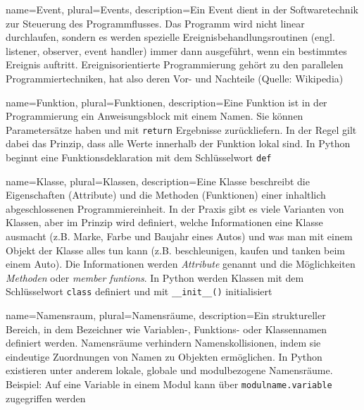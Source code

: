 {
  name={Event},
  plural={Events},
  description={Ein Event dient in der Softwaretechnik zur Steuerung des Programmflusses. Das Programm wird nicht linear durchlaufen, sondern es werden spezielle Ereignisbehandlungsroutinen (engl. listener, observer, event handler) immer dann ausgeführt, wenn ein bestimmtes Ereignis auftritt. Ereignisorientierte Programmierung gehört zu den parallelen Programmiertechniken, hat also deren Vor- und Nachteile (Quelle: Wikipedia)}
}

{
  name={Funktion},
  plural={Funktionen},
  description={Eine Funktion ist in der Programmierung ein Anweisungsblock mit einem Namen. Sie können Parametersätze haben und mit \texttt{return} Ergebnisse zurückliefern. In der Regel gilt dabei das Prinzip, dass alle Werte innerhalb der Funktion lokal sind. In Python beginnt eine Funktionsdeklaration mit dem Schlüsselwort \texttt{def}}
}

{
  name={Klasse},
  plural={Klassen},
  description={Eine Klasse beschreibt die Eigenschaften (Attribute) und die Methoden (Funktionen) einer inhaltlich abgeschlossenen Programmiereinheit. In der Praxis gibt es viele Varianten von Klassen, aber im Prinzip wird definiert, welche Informationen eine Klasse ausmacht (z.B. Marke, Farbe und Baujahr eines Autos) und was man mit einem Objekt der Klasse alles tun kann (z.B. beschleunigen, kaufen und tanken beim einem Auto). Die Informationen werden \emph{Attribute} genannt und die Möglichkeiten \emph{Methoden} oder \emph{member funtions}. 
  In Python werden Klassen mit dem Schlüsselwort \texttt{class} definiert und mit \texttt{\_\_init\_\_()} initialisiert} 
}

{
  name={Namensraum},
  plural={Namensräume},
  description={Ein struktureller Bereich, in dem Bezeichner wie Variablen-, Funktions- oder Klassennamen definiert werden. Namensräume verhindern Namenskollisionen, indem sie eindeutige Zuordnungen von Namen zu Objekten ermöglichen. In Python existieren unter anderem lokale, globale und modulbezogene Namensräume. Beispiel: Auf eine Variable in einem Modul kann über \texttt{modulname.variable} zugegriffen werden} 
}


